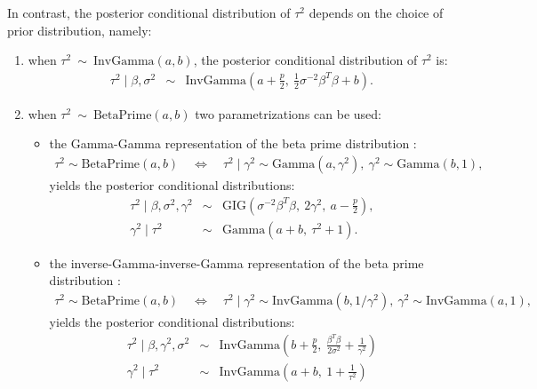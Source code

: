 \documentclass[nojss]{jss}
\begin{document}
In contrast, the posterior conditional distribution of $\tau^2$ depends on the choice of prior distribution, namely:
\begin{enumerate}
	\item when $\tau^2 \ \sim\  \mathrm{InvGamma}(a, b)$, the posterior conditional distribution of $\tau^{2}$ is:
\begin{eqnarray*}
		\tau^2\mid \beta, \sigma^2 &\sim& \mathrm{InvGamma} \left( a + \frac{p}{2},\  \frac{1}{2} \sigma^{-2}\beta^T \beta + b  \right).
\end{eqnarray*}
	\item when $\tau^2 \ \sim\  \mathrm{BetaPrime}(a, b)$ two parametrizations can be used:
  	\begin{itemize}
  	  \item the Gamma-Gamma representation of the beta prime distribution \citep{zhang2016}:
    	  \begin{eqnarray*}
  	      \tau^2 \sim \mathrm{BetaPrime}(a, b)\quad \Leftrightarrow \quad \tau^2 \mid \gamma^2 \sim \mathrm{Gamma}(a, \gamma^2),\ \gamma^2 \sim \mathrm{Gamma}(b, 1),
        \end{eqnarray*}
  	      yields the posterior conditional distributions:
  	    \begin{eqnarray*}
		      \tau^2\mid \beta, \sigma^2, \gamma^2 &\sim& \mathrm{GIG}\left( \sigma^{-2} \beta^T \beta,\ 2\gamma^2,\ a-\frac{p}{2} \right),\\
		      \gamma^2\mid \tau^2 &\sim& \mathrm{Gamma}\left( a + b,\ \tau^2 + 1 \right).
        \end{eqnarray*}
  	  \item the inverse-Gamma-inverse-Gamma representation of the beta prime distribution \citep[Proposition 1]{schmidt2020}:
  	    \begin{eqnarray*}
  	      \tau^2 \sim \mathrm{BetaPrime}(a, b)\quad \Leftrightarrow \quad \tau^2 \mid \gamma^2 \sim \mathrm{InvGamma}(b, 1/\gamma^2),\ \gamma^2 \sim \mathrm{InvGamma}(a, 1),
        \end{eqnarray*}
        yields the posterior conditional distributions:
  	    \begin{eqnarray*}
          \tau^2\mid \beta, \gamma^2, \sigma^2 &\sim& \mathrm{InvGamma}\left( b+\frac{p}{2},\ \frac{\beta^T \beta}{2 \sigma^2} + \frac{1}{\gamma^2} \right)\\
          \gamma^2\mid \tau^2 &\sim& \mathrm{InvGamma}\left( a + b,\ 1 + \frac{1}{\tau^2} \right)
        \end{eqnarray*}
  	\end{itemize}

\end{enumerate}
\end{document}
